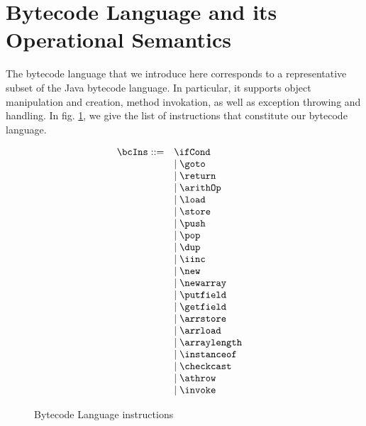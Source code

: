 
\newtheorem{StateTransition}{Definition}[section]
\newtheorem{transClosStateTrans0}[StateTransition]{Definition}
\newtheorem{transClosStateTrans1}[StateTransition]{Definition}



\section{Bytecode Language and its Operational Semantics} \label{opSem}
 The bytecode language that we introduce here corresponds to a representative subset of the Java bytecode language. 
 In particular, it supports object manipulation and creation, method invokation, as well as exception throwing and handling.
 In fig. \ref{opSem:bclang}, we give the list of instructions that constitute our bytecode
 language.
 
 \begin{figure}[h] 
      $$  \begin{array}{lll}
             \bcIns ::= & \ifCond & \\
	                & \mid \goto  & \\ 
			& \mid \return  &\\ 
			& \mid \arithOp  & \\ 
			& \mid \load & \\ 
			& \mid \store & \\
			& \mid \push & \\
			& \mid \pop & \\
			& \mid \dup & \\
			& \mid \iinc & \\
			& \mid \new & \\
			& \mid \newarray &  \\ 	
			& \mid \putfield  & \\
			& \mid \getfield  & \\
			& \mid \arrstore &  \\
			& \mid \arrload  & \\
			& \mid \arraylength  & \\
			& \mid \instanceof  & \\
			& \mid \checkcast &  \\
			& \mid \athrow  & \\
			& \mid \invoke  & \\
	\end{array}$$
        \caption{Bytecode Language instructions }
        \label{opSem:bclang}
  \end{figure}  
 	 
